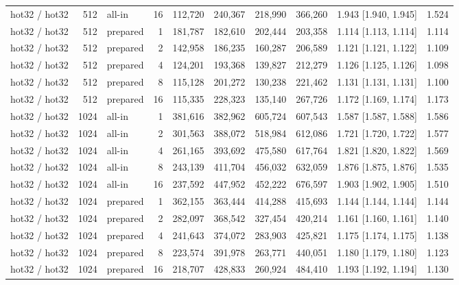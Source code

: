 \begin{table}[t]
{\begin{tabular}{lrlrrrrrlr}
hot32 / hot32 & 512 & all-in & 16 & 112{,}720 & 240{,}367 & 218{,}990 & 366{,}260 & 1.943 [1.940, 1.945] & 1.524 \\
hot32 / hot32 & 512 & prepared & 1 & 181{,}787 & 182{,}610 & 202{,}444 & 203{,}358 & 1.114 [1.113, 1.114] & 1.114 \\
hot32 / hot32 & 512 & prepared & 2 & 142{,}958 & 186{,}235 & 160{,}287 & 206{,}589 & 1.121 [1.121, 1.122] & 1.109 \\
hot32 / hot32 & 512 & prepared & 4 & 124{,}201 & 193{,}368 & 139{,}827 & 212{,}279 & 1.126 [1.125, 1.126] & 1.098 \\
hot32 / hot32 & 512 & prepared & 8 & 115{,}128 & 201{,}272 & 130{,}238 & 221{,}462 & 1.131 [1.131, 1.131] & 1.100 \\
hot32 / hot32 & 512 & prepared & 16 & 115{,}335 & 228{,}323 & 135{,}140 & 267{,}726 & 1.172 [1.169, 1.174] & 1.173 \\
hot32 / hot32 & 1024 & all-in & 1 & 381{,}616 & 382{,}962 & 605{,}724 & 607{,}543 & 1.587 [1.587, 1.588] & 1.586 \\
hot32 / hot32 & 1024 & all-in & 2 & 301{,}563 & 388{,}072 & 518{,}984 & 612{,}086 & 1.721 [1.720, 1.722] & 1.577 \\
hot32 / hot32 & 1024 & all-in & 4 & 261{,}165 & 393{,}692 & 475{,}580 & 617{,}764 & 1.821 [1.820, 1.822] & 1.569 \\
hot32 / hot32 & 1024 & all-in & 8 & 243{,}139 & 411{,}704 & 456{,}032 & 632{,}059 & 1.876 [1.875, 1.876] & 1.535 \\
hot32 / hot32 & 1024 & all-in & 16 & 237{,}592 & 447{,}952 & 452{,}222 & 676{,}597 & 1.903 [1.902, 1.905] & 1.510 \\
hot32 / hot32 & 1024 & prepared & 1 & 362{,}155 & 363{,}444 & 414{,}288 & 415{,}693 & 1.144 [1.144, 1.144] & 1.144 \\
hot32 / hot32 & 1024 & prepared & 2 & 282{,}097 & 368{,}542 & 327{,}454 & 420{,}214 & 1.161 [1.160, 1.161] & 1.140 \\
hot32 / hot32 & 1024 & prepared & 4 & 241{,}643 & 374{,}072 & 283{,}903 & 425{,}821 & 1.175 [1.174, 1.175] & 1.138 \\
hot32 / hot32 & 1024 & prepared & 8 & 223{,}574 & 391{,}978 & 263{,}771 & 440{,}051 & 1.180 [1.179, 1.180] & 1.123 \\
hot32 / hot32 & 1024 & prepared & 16 & 218{,}707 & 428{,}833 & 260{,}924 & 484{,}410 & 1.193 [1.192, 1.194] & 1.130 \\
\bottomrule
\end{tabular}}

\end{table}
